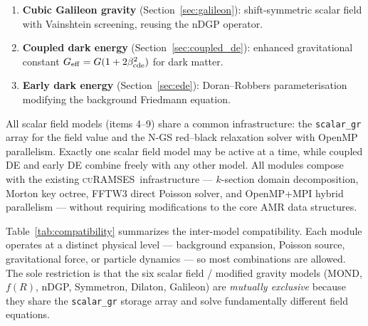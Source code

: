 \documentclass[fleqn,usenatbib]{mnras}
\newcommand{\curamses}{\textsc{cuRAMSES}}
\newcommand{\code}[1]{\texttt{#1}}
\newcommand{\fR}{f(R)}
\newcommand{\Geff}{G_{\rm eff}}
\newcommand{\betacde}{\beta_{\rm cde}}
\begin{document}
\begin{enumerate}
\item \textbf{Cubic Galileon gravity}
  (Section~\ref{sec:galileon}): shift-symmetric scalar field with
  Vainshtein screening, reusing the nDGP operator.

\item \textbf{Coupled dark energy}
  (Section~\ref{sec:coupled_de}): enhanced gravitational constant
  $\Geff = G(1+2\betacde^2)$ for dark matter.

\item \textbf{Early dark energy}
  (Section~\ref{sec:ede}): Doran--Robbers parameterisation
  modifying the background Friedmann equation.
\end{enumerate}

All scalar field models (items 4--9) share a common infrastructure:
the \code{scalar\_gr} array for the field value and the N-GS
red--black relaxation solver with OpenMP parallelism.  Exactly one
scalar field model may be active at a time, while coupled DE and
early DE combine freely with any other model.  All modules compose
with the existing \curamses\ infrastructure --- $k$-section domain
decomposition, Morton key octree, FFTW3 direct Poisson solver, and
OpenMP+MPI hybrid parallelism --- without requiring modifications to
the core AMR data structures.

Table~\ref{tab:compatibility} summarizes the inter-model compatibility.
Each module operates at a distinct physical level --- background
expansion, Poisson source, gravitational force, or particle dynamics
--- so most combinations are allowed.  The sole restriction is that
the six scalar field / modified gravity models (MOND, $\fR$, nDGP,
Symmetron, Dilaton, Galileon) are \emph{mutually exclusive} because
they share the \code{scalar\_gr} storage array and solve fundamentally
different field equations.
\end{document}
